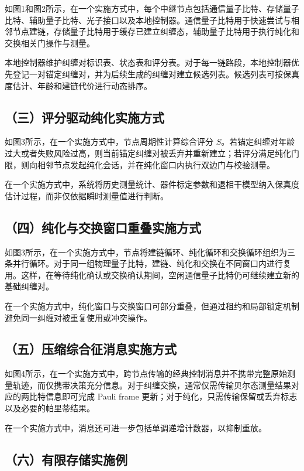\documentclass[12pt,a4paper]{article}
\begin{document}
如图1和图2所示，在一个实施方式中，每个中继节点包括通信量子比特、存储量子比特、辅助量子比特、光子接口以及本地控制器。通信量子比特用于快速尝试与相邻节点建链，存储量子比特用于缓存已建立纠缠态，辅助量子比特用于执行纯化和交换相关门操作与测量。

本地控制器维护纠缠对标识表、状态表和评分表。对于每一链路段，本地控制器优先登记一对锚定纠缠对，并为后续生成的纠缠对建立候选列表。候选列表可按保真度估计、年龄和建链代价进行动态排序。

\subsection*{（三）评分驱动纯化实施方式}

如图3所示，在一个实施方式中，节点周期性计算综合评分 $S$。若锚定纠缠对年龄过大或者失败风险过高，则当前锚定纠缠对被丢弃并重新建立；若评分满足纯化门限，则向相邻节点发起纯化会话，并在纯化窗口内执行双边门与校验测量。

在一个实施方式中，系统将历史测量统计、器件标定参数和退相干模型纳入保真度估计过程，而非仅依据瞬时测量值进行判断。

\subsection*{（四）纯化与交换窗口重叠实施方式}

如图3所示，在一个实施方式中，节点将建链循环、纯化循环和交换循环组织为三条并行循环。对于同一组物理量子比特，建链、纯化和交换在不同窗口内进行复用。这样，在等待纯化确认或交换确认期间，空闲通信量子比特仍可继续建立新的基础纠缠对。

在一个实施方式中，纯化窗口与交换窗口可部分重叠，但通过租约和局部锁定机制避免同一纠缠对被重复使用或冲突操作。

\subsection*{（五）压缩综合征消息实施方式}

如图4所示，在一个实施方式中，跨节点传输的经典控制消息并不携带完整原始测量轨迹，而仅携带决策充分信息。对于纠缠交换，通常仅需传输贝尔态测量结果对应的两比特信息即可完成 Pauli frame 更新；对于纯化，只需传输保留或丢弃标志以及必要的帕里蒂结果。

在一个实施方式中，消息还可进一步包括单调递增计数器，以抑制重放。

\subsection*{（六）有限存储实施例}
\end{document}
